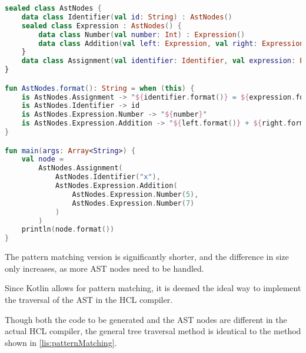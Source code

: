 \begin{lstlisting}[language=Kotlin,label=lis:patternMatching,caption=Tree traversal using pattern matching.]
sealed class AstNodes {
	data class Identifier(val id: String) : AstNodes()
	sealed class Expression : AstNodes() {
		data class Number(val number: Int) : Expression()
		data class Addition(val left: Expression, val right: Expression) : Expression()
	}
	data class Assignment(val identifier: Identifier, val expression: Expression) : AstNodes()
}

fun AstNodes.format(): String = when (this) {
	is AstNodes.Assignment -> "${identifier.format()} = ${expression.format()}"
	is AstNodes.Identifier -> id
	is AstNodes.Expression.Number -> "${number}"
	is AstNodes.Expression.Addition -> "${left.format()} + ${right.format()}"
}

fun main(args: Array<String>) {
	val node =
		AstNodes.Assignment(
			AstNodes.Identifier("x"),
			AstNodes.Expression.Addition(
				AstNodes.Expression.Number(5),
				AstNodes.Expression.Number(7)
			)
		)
	println(node.format())
}
\end{lstlisting}

The pattern matching version is significantly shorter, and the difference in size only increases, as more AST nodes need to be handled.

Since Kotlin allows for pattern matching, it is deemed the ideal way to implement the traversal of the AST in the HCL compiler.

Though both the code to be generated and the AST nodes are different in the actual HCL compiler, the general tree traversal method is identical to the method shown in \ref{lis:patternMatching}.

